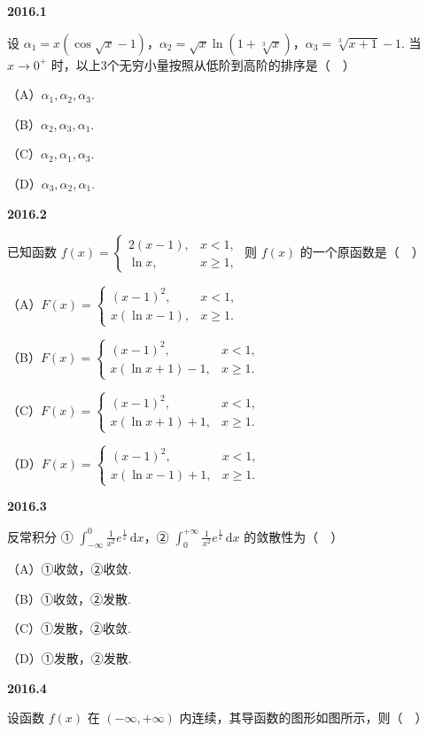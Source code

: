 \documentclass[UTF8,12pt,fontset=windows]{ctexart}
\begin{document}
{\large\bfseries 2016.1}

设 $\alpha_1 = x(\cos\sqrt{x} - 1)$，$\alpha_2 = \sqrt{x}\ln(1 + \sqrt[3]{x})$，$\alpha_3 = \sqrt[3]{x + 1} - 1$. 当 $x \to 0^+$ 时，以上3个无穷小量按照从低阶到高阶的排序是（　）

（A）$\alpha_1, \alpha_2, \alpha_3$.

（B）$\alpha_2, \alpha_3, \alpha_1$.

（C）$\alpha_2, \alpha_1, \alpha_3$.

（D）$\alpha_3, \alpha_2, \alpha_1$.

\vfill
\newpage
{\large\bfseries 2016.2}

已知函数 $f(x) = \begin{cases} 2(x - 1), & x < 1, \\ \ln x, & x \geqslant 1, \end{cases}$ 则 $f(x)$ 的一个原函数是（　）

（A）$F(x) = \begin{cases} (x - 1)^2, & x < 1, \\ x(\ln x - 1), & x \geqslant 1. \end{cases}$

（B）$F(x) = \begin{cases} (x - 1)^2, & x < 1, \\ x(\ln x + 1) - 1, & x \geqslant 1. \end{cases}$

（C）$F(x) = \begin{cases} (x - 1)^2, & x < 1, \\ x(\ln x + 1) + 1, & x \geqslant 1. \end{cases}$

（D）$F(x) = \begin{cases} (x - 1)^2, & x < 1, \\ x(\ln x - 1) + 1, & x \geqslant 1. \end{cases}$

\vfill
\newpage
{\large\bfseries 2016.3}

反常积分 ① $\int_{-\infty}^0 \frac{1}{x^2}e^{\frac{1}{x}}\,\mathrm{d}x$，② $\int_0^{+\infty} \frac{1}{x^2}e^{\frac{1}{x}}\,\mathrm{d}x$ 的敛散性为（　）

（A）①收敛，②收敛.

（B）①收敛，②发散.

（C）①发散，②收敛.

（D）①发散，②发散.

\vfill
\newpage
{\large\bfseries 2016.4}

设函数 $f(x)$ 在 $(-\infty, +\infty)$ 内连续，其导函数的图形如图所示，则（　）
\end{document}
